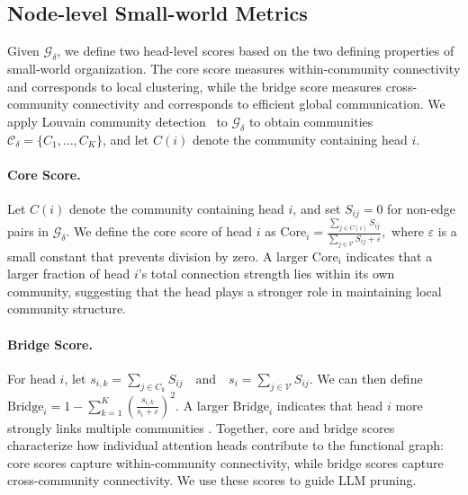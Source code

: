 
\subsection{Node-level Small-world Metrics}
Given $\mathcal{G}_\delta$, we define two head-level scores based on the two defining properties of small-world organization. The core score measures within-community connectivity and corresponds to local clustering, while the bridge score measures cross-community connectivity and corresponds to efficient global communication. We apply Louvain community detection~\cite{blondel2008fast} to $\mathcal{G}_\delta$ to obtain communities $\mathcal{C}_\delta=\{C_1,\ldots,C_K\}$, and let $C(i)$ denote the community containing head $i$.
\paragraph{Core Score.}

Let $C(i)$ denote the community containing head $i$, and set $S_{ij}=0$ for non-edge pairs in $\mathcal{G}_\delta$. We define the core score of head $i$ as
$
\mathrm{Core}_i =
\frac{\sum_{j\in C(i)} S_{ij}}
{\sum_{j\in \mathcal{V}} S_{ij} +\varepsilon},
$
where $\varepsilon$ is a small constant that prevents division by zero. A larger $\mathrm{Core}_i$ indicates that a larger fraction of head $i$'s total connection strength lies within its own community, suggesting that the head plays a stronger role in maintaining local community structure.
\paragraph{Bridge Score.}
For head $i$, let
$
s_{i,k}=\sum_{j\in C_k} S_{ij}
\quad\text{and}\quad
s_i=\sum_{j\in\mathcal{V}} S_{ij}.
$
We can then define
$
\mathrm{Bridge}_i
=
1-
\sum_{k=1}^{K}
\left(
\frac{s_{i,k}}{s_i+\varepsilon}
\right)^2.
$
A larger $\mathrm{Bridge}_i$ indicates that head $i$ more strongly links multiple communities \cite{pedersen2017spontaneous}.
Together, core and bridge scores characterize how individual attention heads contribute to the functional graph: core scores capture within-community connectivity, while bridge scores capture cross-community connectivity. We use these scores to guide LLM pruning.


